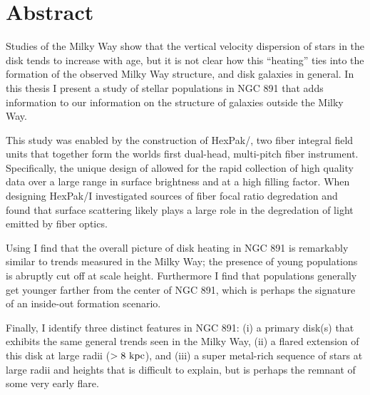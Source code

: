 \chapter{Abstract}

Studies of the Milky Way show that the vertical velocity dispersion of
stars in the disk tends to increase with age, but it is not clear how
this ``heating'' ties into the formation of the observed Milky Way
structure, and disk galaxies in general. In this thesis I present a
study of stellar populations in NGC 891 that adds information to our
information on the structure of galaxies outside the Milky Way. 

This study was enabled by the construction of HexPak/\GP, two fiber
integral field units that together form the worlds first dual-head,
multi-pitch fiber instrument. Specifically, the unique design of \GP
allowed for the rapid collection of high quality data over a large
range in surface brightness and at a high filling factor. When
designing HexPak/\GP I investigated sources of fiber focal ratio
degredation and found that surface scattering likely plays a large
role in the degredation of light emitted by fiber optics.

Using \GP I find that the overall picture of disk heating in NGC 891
is remarkably similar to trends measured in the Milky Way; the
presence of young populations is abruptly cut off at  scale
height. Furthermore I find that populations generally get younger
farther from the center of NGC 891, which is perhaps the signature of
an inside-out formation scenario.

Finally, I identify three distinct features in NGC 891: (i) a primary
disk(s) that exhibits the same general trends seen in the Milky Way,
(ii) a flared extension of this disk at large radii ($>
8~\mathrm{kpc} $), and (iii) a super metal-rich sequence of stars at
large radii and heights that is difficult to explain, but is perhaps
the remnant of some very early flare.
